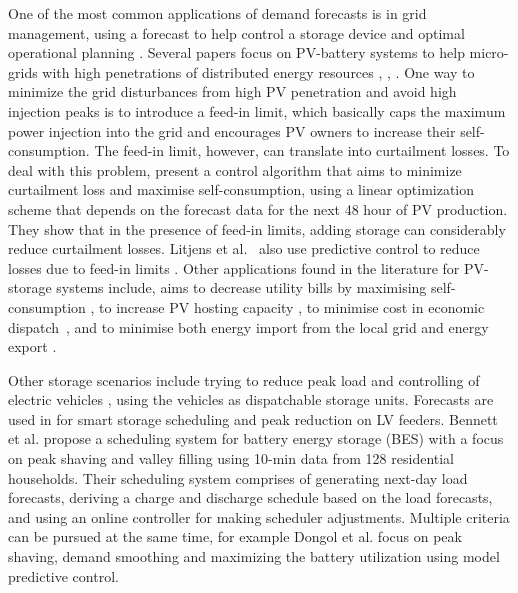 One of the most common applications of demand forecasts is in grid management, using a forecast to help control a storage device \cite{sossan2016atd} and optimal operational planning \cite{Lopez2019psl}. Several papers focus on PV-battery systems to help micro-grids with high penetrations of distributed energy resources \cite{mohamed2017hcd}, \cite{khan2020tee}, \cite{Zafar2018mmp}. One way to minimize the grid disturbances from high PV penetration and avoid high injection peaks is to introduce a feed-in limit, which basically caps the maximum power injection into the grid and encourages PV owners to increase their self-consumption. The feed-in limit, however, can translate into curtailment losses. To deal with this problem, \cite{Riesen2017car} present a control algorithm that aims to minimize curtailment loss and maximise self-consumption, using a linear optimization scheme that depends on the forecast data for the next 48 hour of PV production. They show that in the presence of feed-in limits, adding storage can considerably reduce curtailment losses. Litjens et al.~\cite{Litjens2018aof} also use predictive control to reduce losses due to feed-in limits . Other applications found in the literature for PV-storage systems include, aims to decrease utility bills by maximising self-consumption \cite{Johnson2018ops}, to increase PV hosting capacity \cite{hashemi2018eco}, to minimise cost in economic dispatch~\cite{bersani2006mol}, and to minimise both energy import from the local grid and energy export \cite{stephen2020ngr}.  

Other storage scenarios include trying to reduce peak load \cite{kodaira2020oes,rowe2014apr, nikolovski2018abp,bao2012bes} and controlling of electric vehicles \cite{anastasiadis2017evc}, using the vehicles as dispatchable storage units. Forecasts are used in \cite{Yunusov2018sss} for smart storage scheduling and peak reduction on LV feeders. Bennett et al. \cite{bennett2015doa} propose a scheduling system for battery energy storage (BES) with a focus on peak shaving and valley filling using 10-min data from 128 residential households. Their scheduling system comprises of generating next-day load forecasts, deriving a charge and discharge schedule based on the load forecasts, and using an online controller for making scheduler adjustments. Multiple criteria can be pursued at the same time, for example Dongol et al. \cite{Dongol2018amp} focus on peak shaving, demand smoothing and maximizing the battery utilization using model predictive control. 

